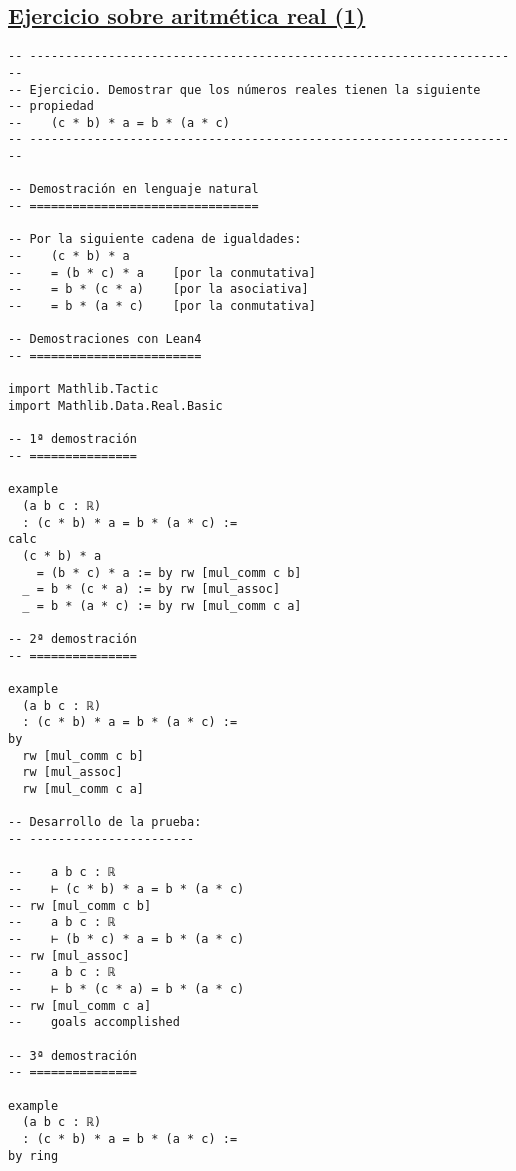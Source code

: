 \subsection{\href{./src/Basicos/Ejercicio\_sobre\_aritmetica\_real\_1.lean}{Ejercicio sobre aritmética real (1)}}
\label{sec:orga8d723b}
\begin{verbatim}
-- ---------------------------------------------------------------------
-- Ejercicio. Demostrar que los números reales tienen la siguiente
-- propiedad
--    (c * b) * a = b * (a * c)
-- ---------------------------------------------------------------------

-- Demostración en lenguaje natural
-- ================================

-- Por la siguiente cadena de igualdades:
--    (c * b) * a
--    = (b * c) * a    [por la conmutativa]
--    = b * (c * a)    [por la asociativa]
--    = b * (a * c)    [por la conmutativa]

-- Demostraciones con Lean4
-- ========================

import Mathlib.Tactic
import Mathlib.Data.Real.Basic

-- 1ª demostración
-- ===============

example
  (a b c : ℝ)
  : (c * b) * a = b * (a * c) :=
calc
  (c * b) * a
    = (b * c) * a := by rw [mul_comm c b]
  _ = b * (c * a) := by rw [mul_assoc]
  _ = b * (a * c) := by rw [mul_comm c a]

-- 2ª demostración
-- ===============

example
  (a b c : ℝ)
  : (c * b) * a = b * (a * c) :=
by
  rw [mul_comm c b]
  rw [mul_assoc]
  rw [mul_comm c a]

-- Desarrollo de la prueba:
-- -----------------------

--    a b c : ℝ
--    ⊢ (c * b) * a = b * (a * c)
-- rw [mul_comm c b]
--    a b c : ℝ
--    ⊢ (b * c) * a = b * (a * c)
-- rw [mul_assoc]
--    a b c : ℝ
--    ⊢ b * (c * a) = b * (a * c)
-- rw [mul_comm c a]
--    goals accomplished

-- 3ª demostración
-- ===============

example
  (a b c : ℝ)
  : (c * b) * a = b * (a * c) :=
by ring
\end{verbatim}

